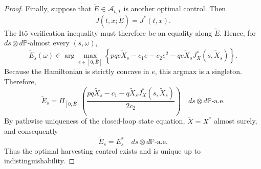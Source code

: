 \documentclass[10pt,a4paper]{amsart}
\begin{document}
\begin{proof}
		Finally, suppose that $\widetilde E\in\mathcal{A}_{t,T}$ is another optimal control. Then
		\[
		J(t,x;\widetilde E)=J^*(t,x).
		\]
		The It\^o verification inequality must therefore be an equality along $\widetilde E$. Hence, for $ds\otimes d\mathbb{P}$-almost every $(s,\omega)$,
		\[
		\widetilde E_s(\omega)
		\in
		\arg\max_{e\in[0,\bar E]}
		\left\{
		pq e\widetilde X_s-c_1e-c_2e^2
		-qe\widetilde X_sJ_X^*(s,\widetilde X_s)
		\right\}.
		\]
		Because the Hamiltonian is strictly concave in $e$, this argmax is a singleton. Therefore,
		\[
		\widetilde E_s
		=
		\Pi_{[0,\bar E]}
		\left(
		\frac{pq\widetilde X_s-c_1-q\widetilde X_sJ_X^*(s,\widetilde X_s)}{2c_2}
		\right)
		\quad
		ds\otimes d\mathbb{P}\text{-a.e.}
		\]
		By pathwise uniqueness of the closed-loop state equation, $\widetilde X=X^*$ almost surely, and consequently
		\[
		\widetilde E_s=E_s^*
		\quad
		ds\otimes d\mathbb{P}\text{-a.e.}
		\]
		Thus the optimal harvesting control exists and is unique up to indistinguishability.
	\end{proof}
\end{document}
